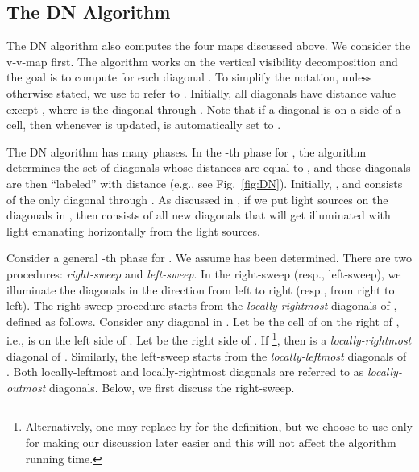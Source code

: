 \documentclass[english,runningheads,11pt]{llncs-revised}
\begin{document}
\subsection{The DN Algorithm}
\label{sec:DN}


The DN algorithm also computes the four maps discussed above. We consider the
v-v-map first. The algorithm works on the vertical visibility
decomposition  and the goal is to compute  for each
diagonal .
To simplify the notation, unless otherwise
stated, we use  to refer to .
Initially, all diagonals have distance value
 except , where  is the diagonal through .
Note that if a diagonal  is on a side  of a cell, then
whenever  is updated,  is automatically set to .

The DN algorithm has many phases. In the -th phase for , the
algorithm determines the set  of diagonals  whose distances
 are equal to , and these diagonals are then ``labeled''
with distance  (e.g., see Fig.~\ref{fig:DN}). Initially, , and  consists of
the only diagonal through . As discussed in \cite{ref:DasGe91},
if we put light sources on the diagonals in ,
then  consists of all new diagonals that will get illuminated with light emanating horizontally from the light sources.

Consider a general -th phase for .
We assume  has been determined. There are
two procedures: {\em right-sweep} and {\em left-sweep}. In the
right-sweep (resp., left-sweep), we illuminate the diagonals in the direction
from left to right (resp., from right to left).
The right-sweep procedure starts from the
{\em locally-rightmost} diagonals of , defined as follows.
Consider any diagonal  in . Let  be the cell of  on the
right of , i.e.,  is on the left side of .
Let  be the right side of . If \footnote{
Alternatively, one may replace  by 
for the definition, but we choose to use  only for
making our discussion later easier and this will not affect the
algorithm running time.}, then  is a {\em locally-rightmost} diagonal of .
Similarly, the left-sweep starts from the {\em
locally-leftmost} diagonals of . Both
locally-leftmost and locally-rightmost diagonals are referred to as
{\em locally-outmost} diagonals. Below, we first discuss the
right-sweep.
\end{document}
